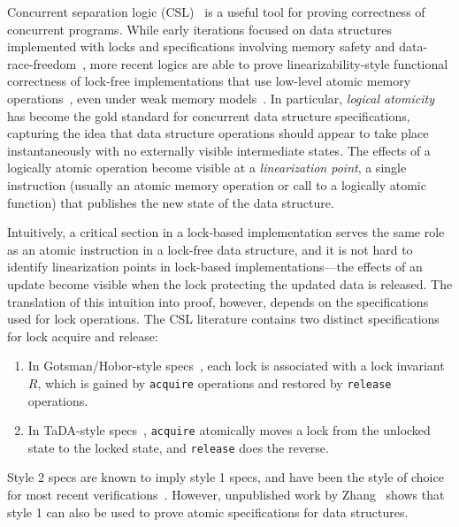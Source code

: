 

Concurrent separation logic (CSL)~\cite{csl} is a useful tool for proving correctness of concurrent programs. While early iterations focused on data structures implemented with locks and specifications involving memory safety and data-race-freedom~\cite{gotsman,oraclesematic}, more recent logics are able to prove linearizability-style functional correctness of lock-free implementations that use low-level atomic memory operations~\cite{tada,iris}, even under weak memory models~\cite{rustbelt-relaxed}. In particular, \emph{logical atomicity}~\cite{tada} has become the gold standard for concurrent data structure specifications, capturing the idea that data structure operations should appear to take place instantaneously with no externally visible intermediate states. The effects of a logically atomic operation become visible at a \emph{linearization point}, a single instruction (usually an atomic memory operation or call to a logically atomic function) that publishes the new state of the data structure.

Intuitively, a critical section in a lock-based implementation serves the same role as an atomic instruction in a lock-free data structure, and it is not hard to identify linearization points in lock-based implementations---the effects of an update become visible when the lock protecting the updated data is released. The translation of this intuition into proof, however, depends on the specifications used for lock operations. The CSL literature contains two distinct specifications for lock acquire and release:
\begin{enumerate}
\item In Gotsman/Hobor-style specs~\cite{gotsman,oraclesematic}, each lock is associated with a lock invariant $R$, which is gained by \texttt{acquire} operations and restored by \texttt{release} operations.
\item In TaDA-style specs~\cite{tada}, \texttt{acquire} atomically moves a lock from the unlocked state to the locked state, and \texttt{release} does the reverse.
\end{enumerate}
Style 2 specs are known to imply style 1 specs, and have been the style of choice for most recent verifications~\cite{tada-live,templates}. However, unpublished work by Zhang~\cite{atomic-syncer} shows that style 1 can also be used to prove atomic specifications for data structures.

